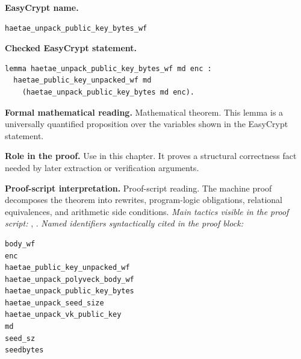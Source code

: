 \begin{formaltheorem}
\noindent\textbf{EasyCrypt name.}
\begin{lstlisting}[language=EasyCrypt,basicstyle=\ttfamily\scriptsize]
haetae_unpack_public_key_bytes_wf
\end{lstlisting}
\noindent\textbf{Checked EasyCrypt statement.}
\begin{lstlisting}[language=EasyCrypt,basicstyle=\ttfamily\scriptsize]
lemma haetae_unpack_public_key_bytes_wf md enc :
  haetae_public_key_unpacked_wf md
    (haetae_unpack_public_key_bytes md enc).
\end{lstlisting}
\noindent\textbf{Formal mathematical reading.}
Mathematical theorem. This lemma is a universally quantified proposition over the variables shown in the EasyCrypt statement.

\noindent\textbf{Role in the proof.}
Use in this chapter. It proves a structural correctness fact needed by later extraction or verification arguments.

\noindent\textbf{Proof-script interpretation.}
Proof-script reading. The machine proof decomposes the theorem into rewrites, program-logic obligations, relational equivalences, and arithmetic side conditions.
\emph{Main tactics visible in the proof script:} , .
\emph{Named identifiers syntactically cited in the proof block:}
\begin{lstlisting}[language=EasyCrypt,basicstyle=\ttfamily\scriptsize]
body_wf
enc
haetae_public_key_unpacked_wf
haetae_unpack_polyveck_body_wf
haetae_unpack_public_key_bytes
haetae_unpack_seed_size
haetae_unpack_vk_public_key
md
seed_sz
seedbytes
\end{lstlisting}

\end{formaltheorem}

